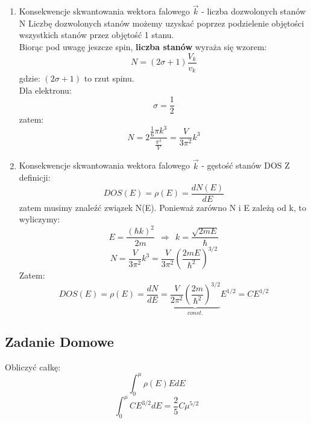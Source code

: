 \begin{enumerate}
\item Konsekwencje skwantowania wektora falowego $\vec{k}$ - liczba dozwolonych stanów N
Liczbę dozwolonych stanów możemy uzyskać poprzez podzielenie objętości wszystkich stanów przez objętość 1 stanu.\\
Biorąc pod uwagę jeszcze spin,\textbf{ liczba stanów} wyraża się wzorem:
\begin{equation} N=(2\sigma+1)\frac{V_k}{v_k} \end{equation}
gdzie: $(2\sigma+1)$ to rzut spinu.\\
 Dla elektronu:
\begin{equation}\sigma=\frac{1}{2}\end{equation}
zatem:
\begin{equation} N=2\frac{\frac{1}{6}\pi k^3}{\frac{\pi^3}{V}} = \frac{V}{3\pi^2}k^3\end{equation}
\item Konsekwencje skwantowania wektora falowego $\vec{k}$ - gęstość stanów DOS
Z definicji:
\begin{equation} DOS(E)=\rho(E)=\frac{dN(E)}{dE}\end{equation}
zatem musimy znaleźć związek N(E). Ponieważ zarówno N i E zależą od k, to wyliczymy:
\begin{equation}E=\frac{(\hbar k)^2}{2m}~~\Rightarrow~~k=\frac{\sqrt{2mE}}{\hbar}\end{equation}
\begin{equation}N= \frac{V}{3\pi^2}k^3=\frac{V}{3\pi^2}(\frac{{2mE}}{\hbar^2})^{3/2} \end{equation}
Zatem:
\begin{equation} DOS(E)=\rho(E)=\frac{dN}{dE}=\underbrace{\frac{V}{2\pi^2}(\frac{2m}{\hbar^2})^{3/2}}_{const.}E^{1/2}=CE^{1/2}\end{equation}
\end{enumerate}

\subsection{Zadanie Domowe}
Obliczyć całkę:
\begin{equation}\int_0^\mu \rho(E)E dE\end{equation}
\begin{equation}\int_0^\mu CE^{3/2} dE=\frac{2}{5}C\mu^{5/2}\end{equation}

